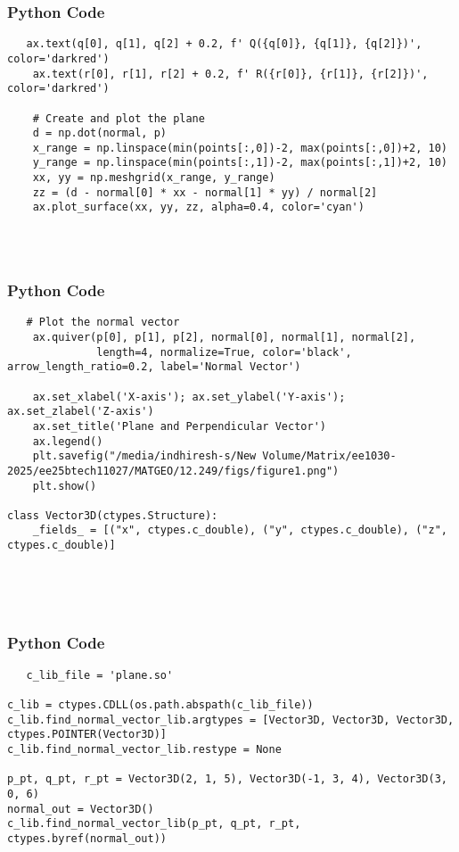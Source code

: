 \documentclass{beamer}
\begin{document}
    \begin{frame}[fragile]
        \frametitle{Python Code}
        \begin{lstlisting}
   ax.text(q[0], q[1], q[2] + 0.2, f' Q({q[0]}, {q[1]}, {q[2]})', color='darkred')
    ax.text(r[0], r[1], r[2] + 0.2, f' R({r[0]}, {r[1]}, {r[2]})', color='darkred')
    
    # Create and plot the plane
    d = np.dot(normal, p)
    x_range = np.linspace(min(points[:,0])-2, max(points[:,0])+2, 10)
    y_range = np.linspace(min(points[:,1])-2, max(points[:,1])+2, 10)
    xx, yy = np.meshgrid(x_range, y_range)
    zz = (d - normal[0] * xx - normal[1] * yy) / normal[2]
    ax.plot_surface(xx, yy, zz, alpha=0.4, color='cyan')

    
   
        \end{lstlisting}
    \end{frame}
    
    \begin{frame}[fragile]
        \frametitle{Python Code}
        \begin{lstlisting}
   # Plot the normal vector
    ax.quiver(p[0], p[1], p[2], normal[0], normal[1], normal[2],
              length=4, normalize=True, color='black', arrow_length_ratio=0.2, label='Normal Vector')

    ax.set_xlabel('X-axis'); ax.set_ylabel('Y-axis'); ax.set_zlabel('Z-axis')
    ax.set_title('Plane and Perpendicular Vector')
    ax.legend()
    plt.savefig("/media/indhiresh-s/New Volume/Matrix/ee1030-2025/ee25btech11027/MATGEO/12.249/figs/figure1.png")
    plt.show()

class Vector3D(ctypes.Structure):
    _fields_ = [("x", ctypes.c_double), ("y", ctypes.c_double), ("z", ctypes.c_double)]



   
        \end{lstlisting}
    \end{frame}
    
    \begin{frame}[fragile]
        \frametitle{Python Code}
        \begin{lstlisting}
   c_lib_file = 'plane.so'

c_lib = ctypes.CDLL(os.path.abspath(c_lib_file))
c_lib.find_normal_vector_lib.argtypes = [Vector3D, Vector3D, Vector3D, ctypes.POINTER(Vector3D)]
c_lib.find_normal_vector_lib.restype = None

p_pt, q_pt, r_pt = Vector3D(2, 1, 5), Vector3D(-1, 3, 4), Vector3D(3, 0, 6)
normal_out = Vector3D()
c_lib.find_normal_vector_lib(p_pt, q_pt, r_pt, ctypes.byref(normal_out))



        \end{lstlisting}
    \end{frame}
\end{document}
